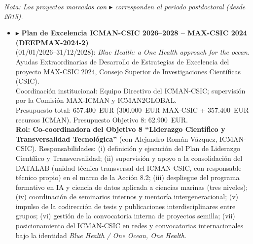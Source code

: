 \documentclass[11pt,a4paper]{article}
\begin{document}
\vspace{0.5em}
\noindent\textit{\small Nota: Los proyectos marcados con $\blacktriangleright$ corresponden al periodo postdoctoral (desde 2015).}

\vspace{0.5em}

\begin{itemize}[leftmargin=*]

    \item $\blacktriangleright$ \textbf{Plan de Excelencia ICMAN-CSIC 2026--2028 -- MAX-CSIC 2024 (DEEPMAX-2024-2)} \\(01/01/2026--31/12/2028):
    \textit{Blue Health: a One Health approach for the ocean}.\\
    Ayudas Extraordinarias de Desarrollo de Estrategias de Excelencia del proyecto MAX-CSIC 2024, Consejo Superior de Investigaciones Científicas (CSIC).\\
    Coordinación institucional: Equipo Directivo del ICMAN-CSIC; supervisión por la Comisión MAX-ICMAN y ICMAN2GLOBAL.\\
    Presupuesto total: 657.400~EUR (300.000~EUR MAX-CSIC + 357.400~EUR recursos ICMAN). Presupuesto Objetivo 8: 62.900~EUR.\\
    \textbf{Rol: Co-coordinadora del Objetivo 8 ``Liderazgo Científico y Transversalidad Tecnológica''} (con Alejandro Román Vázquez, ICMAN-CSIC). Responsabilidades: (i) definición y ejecución del Plan de Liderazgo Científico y Transversalidad; (ii) supervisión y apoyo a la consolidación del DATALAB (unidad técnica transversal del ICMAN-CSIC, con responsable técnico propio) en el marco de la Acción 8.2; (iii) despliegue del programa formativo en IA y ciencia de datos aplicada a ciencias marinas (tres niveles); (iv) coordinación de seminarios internos y mentoría intergeneracional; (v) impulso de la codirección de tesis y publicaciones interdisciplinares entre grupos; (vi) gestión de la convocatoria interna de proyectos semilla; (vii) posicionamiento del ICMAN-CSIC en redes y convocatorias internacionales bajo la identidad \textit{Blue Health / One Ocean, One Health}.


\end{itemize}
\end{document}
